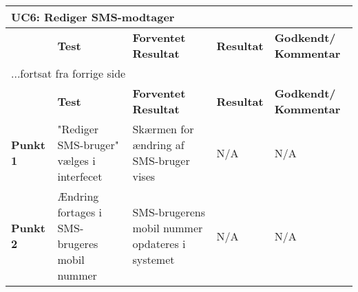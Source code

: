 
\begin{center}
\begin{longtable}{|p{}|p{}|p{3cm}|p{3cm}|p{3cm}|} %
\hline
\multicolumn{5}{|l|}{\textbf{UC6: Rediger SMS-modtager}} \\ \hline
\multicolumn{1}{|c|}{} &
\textbf{Test} &
\textbf{Forventet \newline Resultat} &
\textbf{Resultat} &
\textbf{Godkendt/ \newline Kommentar} \\ \hline 
\endfirsthead

\multicolumn{5}{l}{...fortsat fra forrige side} \\ \hline 
\multicolumn{1}{|c|}{} &
\textbf{Test} &
\textbf{Forventet \newline Resultat} &
\textbf{Resultat} &
\textbf{Godkendt/ \newline Kommentar} \\ \hline 
\endhead


\textbf{Punkt 1} &
"Rediger SMS-bruger" vælges i interfecet &
Skærmen for ændring af SMS-bruger vises &
N/A &
N/A \\\hline

\textbf{Punkt 2} &
Ændring fortages i SMS-brugeres mobil nummer &
SMS-brugerens mobil nummer opdateres i systemet &
N/A &
N/A \\\hline


	\end{longtable}
	\label{ATUC6} 
\end{center}